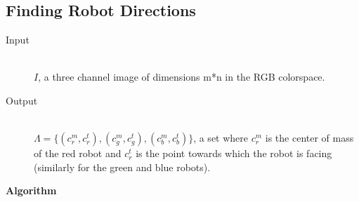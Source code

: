 \documentclass[10pt,a4paper]{article}
\begin{document}
\subsection{Finding Robot Directions}\label{directionalgo}
\begin{description}
\item[Input] \hfill \\
    $I$, a three channel image of dimensions m*n in the RGB colorspace.
\item[Output] \hfill \\
    $\Lambda = \{(c^m_r, c^t_r), (c^m_g, c^t_g), (c^m_b, c^t_b)\}$, a set where
    $c^m_r$ is the center of mass of the red robot and $c^t_r$ is the point 
    towards which the robot is facing (similarly for the green and blue robots).
\end{description}
\textbf{Algorithm}
\end{document}

